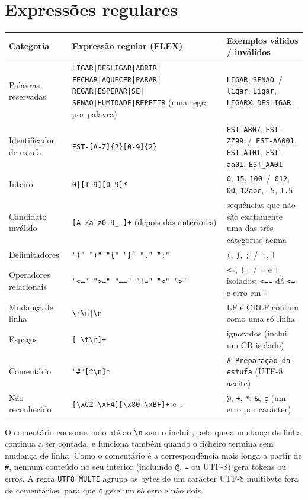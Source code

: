 \documentclass[10pt,a4paper]{article}
\newcommand{\tk}[1]{\texttt{#1}}
\begin{document}
\section{Expressões regulares}
\begin{tabularx}{\textwidth}{@{}l>{\raggedright\arraybackslash}p{4.9cm}>{\raggedright\arraybackslash}X@{}}
\toprule
\textbf{Categoria} & \textbf{Expressão regular (FLEX)} & \textbf{Exemplos válidos / inválidos}\\
\midrule
Palavras reservadas & \tk{LIGAR|DESLIGAR|ABRIR|} \tk{FECHAR|AQUECER|PARAR|} \tk{REGAR|ESPERAR|SE|} \tk{SENAO|HUMIDADE|REPETIR} (uma regra por palavra) &
  \tk{LIGAR}, \tk{SENAO} \,/\, \tk{ligar}, \tk{Ligar}, \tk{LIGARX}, \tk{DESLIGAR\_}\\
Identificador de estufa & \tk{EST-[A-Z]\{2\}[0-9]\{2\}} & \tk{EST-AB07}, \tk{EST-ZZ99} \,/\, \tk{EST-AA001}, \tk{EST-A101}, \tk{EST-aa01}, \tk{EST\_AA01}\\
Inteiro & \tk{0|[1-9][0-9]*} & \tk{0}, \tk{15}, \tk{100} \,/\, \tk{012}, \tk{00}, \tk{12abc}, \tk{-5}, \tk{1.5}\\
Candidato inválido & \tk{[A-Za-z0-9\_-]+} (depois das anteriores) & sequências que não são exatamente uma das três categorias acima\\
Delimitadores & \tk{"(" ")" "\{" "\}" "," ";"} & \tk{(}, \tk{\}}, \tk{;} \,/\, \tk{[}, \tk{]}\\
Operadores relacionais & \tk{"<=" ">=" "==" "!=" "<" ">"} & \tk{<=}, \tk{!=} \,/\, \tk{=} e \tk{!} isolados; \tk{<==} dá \tk{<=} e erro em \tk{=}\\
Mudança de linha & \tk{\textbackslash r\textbackslash n|\textbackslash n} & LF e CRLF contam como uma só linha\\
Espaços & \tk{[ \textbackslash t\textbackslash r]+} & ignorados (inclui um CR isolado)\\
Comentário & \tk{"\#"[\textasciicircum\textbackslash n]*} & \tk{\# Preparação da estufa} (UTF-8 aceite)\\
Não reconhecido & \tk{[\textbackslash xC2-\textbackslash xF4][\textbackslash x80-\textbackslash xBF]+} e \tk{.} & \tk{@}, \tk{+}, \tk{*}, \tk{\&}, \tk{ç} (um erro por carácter)\\
\bottomrule
\end{tabularx}

O comentário consome tudo até ao \tk{\textbackslash n} sem o incluir, pelo que a mudança de linha continua a ser contada,
e funciona também quando o ficheiro termina sem mudança de linha. Como o comentário é a correspondência mais longa
a partir de \tk{\#}, nenhum conteúdo no seu interior (incluindo \tk{@}, \tk{=} ou UTF-8) gera tokens ou erros.
A regra \tk{UTF8\_MULTI} agrupa os bytes de um carácter UTF-8 multibyte fora de comentários, para que \tk{ç} gere um
só erro e não dois.
\end{document}
